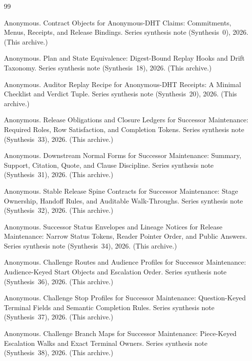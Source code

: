 \documentclass[11pt]{article}
\begin{document}
\begin{thebibliography}{99}\small

Anonymous.
\newblock Contract Objects for Anonymous-DHT Claims: Commitments, Menus, Receipts, and Release Bindings.
\newblock Series synthesis note (Synthesis~0), 2026. (This archive.)

Anonymous.
\newblock Plan and State Equivalence: Digest-Bound Replay Hooks and Drift Taxonomy.
\newblock Series synthesis note (Synthesis~18), 2026. (This archive.)

Anonymous.
\newblock Auditor Replay Recipe for Anonymous-DHT Receipts: A Minimal Checklist and Verdict Tuple.
\newblock Series synthesis note (Synthesis~20), 2026. (This archive.)

Anonymous.
\newblock Release Obligations and Closure Ledgers for Successor Maintenance: Required Roles, Row Satisfaction, and Completion Tokens.
\newblock Series synthesis note (Synthesis~33), 2026. (This archive.)

Anonymous.
\newblock Downstream Normal Forms for Successor Maintenance: Summary, Support, Citation, Quote, and Clause Discipline.
\newblock Series synthesis note (Synthesis~31), 2026. (This archive.)

Anonymous.
\newblock Stable Release Spine Contracts for Successor Maintenance: Stage Ownership, Handoff Rules, and Auditable Walk-Throughs.
\newblock Series synthesis note (Synthesis~32), 2026. (This archive.)

Anonymous.
\newblock Successor Status Envelopes and Lineage Notices for Release Maintenance: Narrow Status Tokens, Reader Pointer Order, and Public Answers.
\newblock Series synthesis note (Synthesis~34), 2026. (This archive.)

Anonymous.
\newblock Challenge Routes and Audience Profiles for Successor Maintenance: Audience-Keyed Start Objects and Escalation Order.
\newblock Series synthesis note (Synthesis~36), 2026. (This archive.)

Anonymous.
\newblock Challenge Stop Profiles for Successor Maintenance: Question-Keyed Terminal Fields and Semantic Completion Rules.
\newblock Series synthesis note (Synthesis~37), 2026. (This archive.)

Anonymous.
\newblock Challenge Branch Maps for Successor Maintenance: Piece-Keyed Escalation Walks and Exact Terminal Owners.
\newblock Series synthesis note (Synthesis~38), 2026. (This archive.)


\end{thebibliography}
\end{document}
